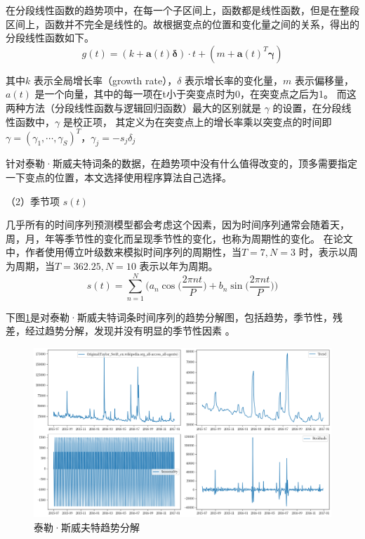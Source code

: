 在分段线性函数的趋势项中，在每一个子区间上，函数都是线性函数，但是在整段区间上，函数并不完全是线性的。故根据变点的位置和变化量之间的关系，得出的分段线性函数如下。
\begin{equation}
  g(t) = (k + \mathbf{a}(t)\mathbf{\delta}) \cdot t + (m + \mathbf{a}(t)^T\mathbf{\gamma})
\end{equation}

其中$k$ 表示全局增长率（growth rate），$\delta$ 表示增长率的变化量，$m$ 表示偏移量，$a(t)$ 是一个向量，其中的每一项在t小于突变点时为0，在突变点之后为1。
而这两种方法（分段线性函数与逻辑回归函数）最大的区别就是 $\gamma$ 的设置，在分段线性函数中，$\gamma$ 是校正项，
其定义为在突变点上的增长率乘以突变点的时间即 $\gamma=(\gamma_{1},\cdots,\gamma_{S})^{T}$，$\gamma_{j}=-s_{j}\delta_{j}$ 

针对泰勒·斯威夫特词条的数据，在趋势项中没有什么值得改变的，顶多需要指定一下变点的位置，本文选择使用程序算法自己选择。

（2）季节项 $s(t)$

几乎所有的时间序列预测模型都会考虑这个因素，因为时间序列通常会随着天，周，月，年等季节性的变化而呈现季节性的变化，也称为周期性的变化。
在论文中\cite{taylor2018forecasting}，作者使用傅立叶级数来模拟时间序列的周期性，当$T = 7, N = 3$ 时，表示以周为周期，当$T = 362.25, N = 10$ 表示以年为周期。
\begin{equation}
  s(t) = \sum_{n=1}^{N}\bigg( a_{n}\cos\bigg(\frac{2\pi n t}{P}\bigg) + b_{n}\sin\bigg(\frac{2\pi n t}{P}\bigg)\bigg)
\end{equation}

下图\ref{Trend-decomposition}是对泰勒·斯威夫特词条时间序列的趋势分解图，包括趋势，季节性，残差，经过趋势分解，发现并没有明显的季节性因素
。

\begin{figure}[htb]
  \centering
  \includegraphics[width=\textwidth]{figures/Trend-decomposition.png}
  \caption{泰勒·斯威夫特趋势分解}
  \label{Trend-decomposition}
\end{figure}

